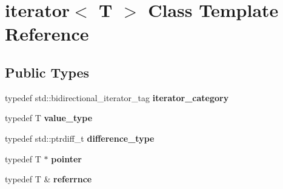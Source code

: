 \hypertarget{classiterator}{}\section{iterator$<$ T $>$ Class Template Reference}
\label{classiterator}
\subsection*{Public Types}
\begin{DoxyCompactItemize}
\item 
\mbox{\label{classiterator_a743a266afa7b73c484bf74461c100eb9}} 
typedef std\+::bidirectional\+\_\+iterator\+\_\+tag {\bfseries iterator\+\_\+category}
\item 
\mbox{\label{classiterator_a3000f949e77f12b9d25292e47e6c9d94}} 
typedef T {\bfseries value\+\_\+type}
\item 
\mbox{\label{classiterator_a9bfdd911ffa5ac8414b56118ecb6722e}} 
typedef std\+::ptrdiff\+\_\+t {\bfseries difference\+\_\+type}
\item 
\mbox{\label{classiterator_aff916de6b5d0d925c095ff69e50dcc2e}} 
typedef T $\ast$ {\bfseries pointer}
\item 
\mbox{\label{classiterator_ab4cb4c59c8799e17f6a2e6a59b9c31f1}} 
typedef T \& {\bfseries referrnce}
\end{DoxyCompactItemize}
